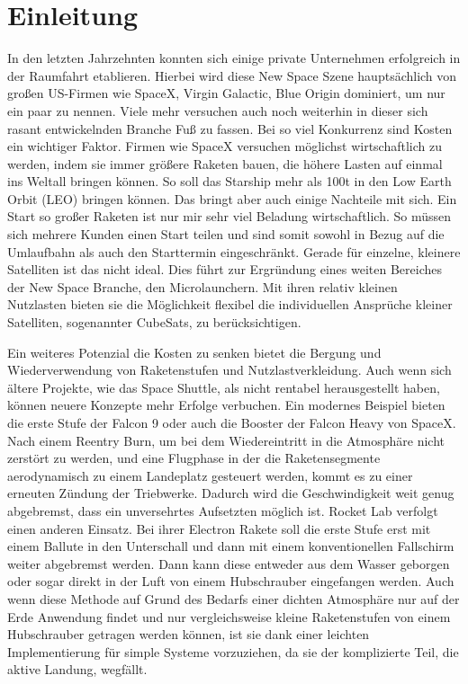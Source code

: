 \chapter{Einleitung}

In den letzten Jahrzehnten konnten sich einige private Unternehmen erfolgreich in der Raumfahrt etablieren. Hierbei wird diese New Space Szene hauptsächlich von großen US-Firmen wie SpaceX, Virgin Galactic, Blue Origin dominiert, um nur ein paar zu nennen. Viele mehr versuchen auch noch weiterhin in dieser sich rasant entwickelnden Branche Fuß zu fassen. Bei so viel Konkurrenz sind Kosten ein wichtiger Faktor. Firmen wie SpaceX versuchen möglichst wirtschaftlich zu werden, indem sie immer größere Raketen bauen, die höhere Lasten auf einmal ins Weltall bringen können. So soll das Starship mehr als 100t in den Low Earth Orbit (LEO) bringen können. Das bringt aber auch einige Nachteile mit sich. Ein Start so großer Raketen ist nur mir sehr viel Beladung wirtschaftlich. So müssen sich mehrere Kunden einen Start teilen und sind somit sowohl in Bezug auf die Umlaufbahn als auch den Starttermin eingeschränkt. Gerade für einzelne, kleinere Satelliten ist das nicht ideal. Dies führt zur Ergründung eines weiten Bereiches der New Space Branche, den Microlaunchern. Mit ihren relativ kleinen Nutzlasten bieten sie die Möglichkeit flexibel die individuellen Ansprüche kleiner Satelliten, sogenannter CubeSats, zu berücksichtigen.

Ein weiteres Potenzial die Kosten zu senken bietet die Bergung und Wiederverwendung von Raketenstufen und Nutzlastverkleidung. Auch wenn sich ältere Projekte, wie das Space Shuttle, als nicht rentabel herausgestellt haben, können neuere Konzepte mehr Erfolge verbuchen. Ein modernes Beispiel bieten die erste Stufe der Falcon 9 oder auch die Booster der Falcon Heavy von SpaceX. Nach einem Reentry Burn, um bei dem Wiedereintritt in die Atmosphäre nicht zerstört zu werden, und eine Flugphase in der die Raketensegmente aerodynamisch zu einem Landeplatz gesteuert werden, kommt es zu einer erneuten Zündung der Triebwerke. Dadurch wird die Geschwindigkeit weit genug abgebremst, dass ein unversehrtes Aufsetzten möglich ist\cite{falconUserGuide}.
Rocket Lab verfolgt einen anderen Einsatz. Bei ihrer Electron Rakete soll die erste Stufe erst mit einem Ballute in den Unterschall und dann mit einem konventionellen Fallschirm weiter abgebremst werden. Dann kann diese entweder aus dem Wasser geborgen oder sogar direkt in der Luft von einem Hubschrauber eingefangen werden\cite{electronRocketLab}. Auch wenn diese Methode auf Grund des Bedarfs einer dichten Atmosphäre nur auf der Erde Anwendung findet und nur vergleichsweise kleine Raketenstufen von einem Hubschrauber getragen werden können, ist sie dank einer leichten Implementierung für simple Systeme vorzuziehen, da sie der komplizierte Teil, die aktive Landung, wegfällt.

